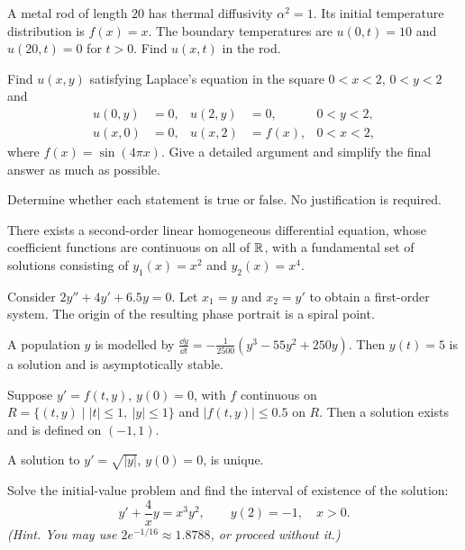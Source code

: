 \documentclass[11pt,oneside]{article}
\begin{document}
\begin{problem}
A metal rod of length $20$ has thermal diffusivity $\alpha^2=1$. Its initial temperature distribution is $f(x)=x$. The boundary temperatures are $u(0,t)=10$ and $u(20,t)=0$ for $t>0$. Find $u(x,t)$ in the rod.
\end{problem}

\begin{problem}
Find $u(x,y)$ satisfying Laplace's equation in the square $0<x<2$, $0<y<2$ and
\[
\begin{aligned}
u(0,y)&=0,&u(2,y)&=0,&0<y<2,\\
u(x,0)&=0,&u(x,2)&=f(x),&0<x<2,
\end{aligned}
\]
where $f(x)=\sin(4\pi x)$. Give a detailed argument and simplify the final answer as much as possible.
\end{problem}

\begin{problem}
Determine whether each statement is true or false. No justification is required.
\begin{problemsubparts}
\item There exists a second-order linear homogeneous differential equation, whose coefficient functions are continuous on all of $\mathbb{R}$, with a fundamental set of solutions consisting of $y_1(x)=x^2$ and $y_2(x)=x^4$.
\item Consider $2y''+4y'+6.5y=0$. Let $x_1=y$ and $x_2=y'$ to obtain a first-order system. The origin of the resulting phase portrait is a spiral point.
\item A population $y$ is modelled by $\displaystyle\frac{\dd y}{\dd t}=-\frac1{2500}(y^3-55y^2+250y)$. Then $y(t)=5$ is a solution and is asymptotically stable.
\item Suppose $y'=f(t,y)$, $y(0)=0$, with $f$ continuous on $R=\{(t,y)\mid |t|\le1,\ |y|\le1\}$ and $|f(t,y)|\le0.5$ on $R$. Then a solution exists and is defined on $(-1,1)$.
\item A solution to $\displaystyle y'=\sqrt{|y|}$, $y(0)=0$, is unique.
\end{problemsubparts}
\end{problem}

\begin{problem}
Solve the initial-value problem and find the interval of existence of the solution:
\[
y'+\frac4x y=x^3y^2,\qquad y(2)=-1,\quad x>0.
\]
\textit{(Hint. You may use $2e^{-1/16}\approx1.8788$, or proceed without it.)}
\end{problem}
\end{document}

